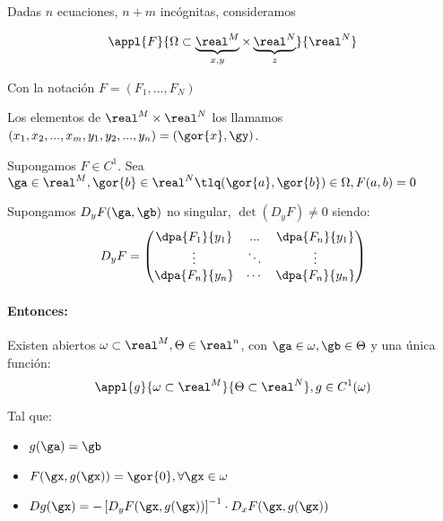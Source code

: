 \begin{theorem}\label{thmFImp}

Dadas $n$ ecuaciones, $n+m$ incógnitas, consideramos 

$$\appl{F}{\Omega\subset\underbrace{\real^M}_{x,y} \times \underbrace{\real^N}_{z}}{\real^N}$$

Con la notación $F = (F_1,...,F_N)$

Los elementos de $\real^M\times\real^N$ los llamamos $(x_1,x_2,...,x_m,y_1,y_2,...,y_n) = (\gor{x},\gy)$.

Supongamos $F\in C^1$. Sea $\ga \in \real^M, \gor{b} \in \real^N \tlq (\gor{a},\gor{b})\in \Omega , F(a,b)=0$

Supongamos $D_yF(\ga,\gb)$ no singular, $\det(D_yF)\neq 0$ siendo:
$$D_yF = \begin{pmatrix}
          \dpa{F_1}{y_1}&...&\dpa{F_n}{y_1}\\
          \vdots&\ddots&\vdots\\
          \dpa{F_n}{y_n}&\cdots&\dpa{F_n}{y_n}
         \end{pmatrix}$$
         
\paragraph{Entonces:} Existen abiertos $\omega \subset \real^M, \Theta \in\real^n$, con $\ga \in \omega, \gb \in \Theta$ y una única función: \[ \appl{g}{\omega\subset\real^M}{\Theta \subset\real^N}, g\in C^1(\omega) \]

Tal que:
\begin{itemize}
 \item $g(\ga) = \gb$
 \item $F(\gx,g(\gx)) = \gor{0}, \forall \gx \in \omega$
 \item $\displaystyle Dg(\gx) = - \left[D_yF(\gx,g(\gx))\right]^{-1} \cdot D_xF(\gx,g(\gx))$
\end{itemize}
\end{theorem}

